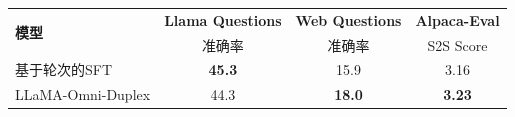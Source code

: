 \begin{table}[!htbp]
    \label{tab:fullduplex_turnbased}
    \centering
    \small
    \begin{tabular}{lccc}
        \toprule
        \multirow{2}{*}{\textbf{模型}} & \textbf{Llama Questions} & \textbf{Web Questions} & \textbf{Alpaca-Eval} \\
        & 准确率 & 准确率 & S2S Score \\
        \midrule
        基于轮次的SFT & \textbf{45.3} & 15.9 & 3.16 \\
        LLaMA-Omni-Duplex & 44.3 & \textbf{18.0} & \textbf{3.23} \\
        \bottomrule
    \end{tabular}
\end{table}
